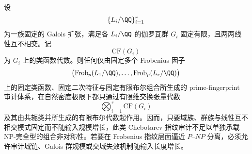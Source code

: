 \begin{conjecture}[固定有限审计域窗口的张量刚性障碍]\label{conj:xi-time-part62eb-fixed-audit-window-tensor-rigidity}
设
\[
\{L_i/\QQ\}_{i=1}^{r}
\]
为一族固定的 Galois 扩张，满足各 \(L_i/\QQ\) 的伽罗瓦群 \(G_i\) 固定有限，且两两线性互不相交。记
\[
\mathrm{CF}(G_i)
\]
为 \(G_i\) 上的类函数代数。则任何仅由固定多个 Frobenius 因子
\[
\bigl(\mathrm{Frob}_p(L_1/\QQ),\dots,\mathrm{Frob}_p(L_r/\QQ)\bigr)
\]
上的固定类函数、固定二次特征与固定有限布尔组合所生成的 prime-fingerprint 审计体系，在自然密度极限下都只通过有限维交换张量代数
\[
\bigotimes_{i=1}^{r}\mathrm{CF}(G_i)
\]
及其由共轭类并所生成的有限布尔代数起作用。因而，只要域族、群族与线性互不相交模式固定而不随输入规模增长，此类 Chebotarev 指纹审计不足以单独承载 NP-完全型的组合非对称性。若要在 Frobenius 指纹层面逼近 \(P\)–\(NP\) 分离，必须允许审计域链、Galois 群规模或交域失效机制随输入长度增长。
\end{conjecture}

\endinput
